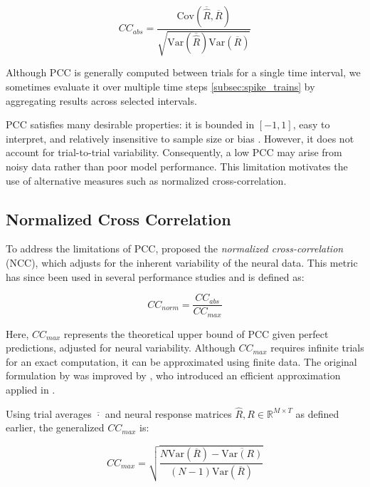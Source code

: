 \begin{equation}
    CC_{abs} = \frac{\text{Cov}(\overline{\hat{R}}, \overline{R})}
    {\sqrt{\text{Var}(\overline{\hat{R}})\text{Var}(\overline{R})}}
\end{equation}
\label{eq:cc_abs}

Although PCC is generally computed between trials for a single time interval, we sometimes evaluate it over multiple time steps \ref{subsec:spike_trains} by aggregating results across selected intervals.

PCC satisfies many desirable properties: it is bounded in $[-1, 1]$, easy to interpret, and relatively insensitive to sample size or bias \citep{Wang2023towards}. However, it does not account for trial-to-trial variability. Consequently, a low PCC may arise from noisy data rather than poor model performance. This limitation motivates the use of alternative measures such as normalized cross-correlation.

\subsection{Normalized Cross Correlation}
\label{subsec:normalized_cross_correlation}

To address the limitations of PCC, \citet{hsu_quantifying_2004} proposed the \emph{normalized cross-correlation} (NCC), which adjusts for the inherent variability of the neural data. This metric has since been used in several performance studies \citet{touryan_spatial_2005, gill_sound_2006, Wang2023towards} and is defined as:

\begin{equation}
    CC_{norm} = \frac{CC_{abs}}{CC_{max}}
\end{equation}
\label{eq:normalized_cc}

Here, $CC_{max}$ represents the theoretical upper bound of PCC given perfect predictions, adjusted for neural variability. Although $CC_{max}$ requires infinite trials for an exact computation, it can be approximated using finite data. The original formulation by \citet{hsu_quantifying_2004} was improved by \citet{schoppe_measuring_2016}, who introduced an efficient approximation applied in \citet{Wang2023towards}.

Using trial averages $\overline{\cdot}$ and neural response matrices $\hat{R}, R \in \mathbb{R}^{M \times T}$ as defined earlier, the generalized $CC_{max}$ is:

\begin{equation}
    CC_{max} = \sqrt{\frac{N\text{Var}(\overline{R}) - \overline{\text{Var}(R)}}{(N-1)\text{Var}(\overline{R})}}
\end{equation}
\label{eq:cc_max_general}


